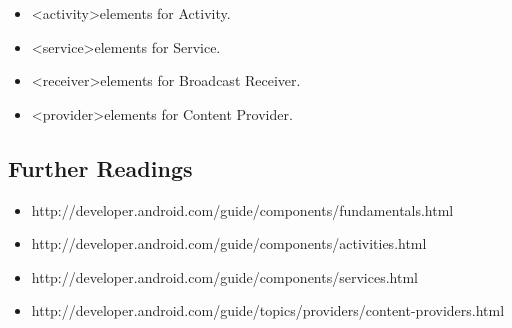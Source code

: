 \documentclass[10pt, letterpaper]{article}
\begin{document}
\begin{itemize}
\item \textless activity\textgreater elements for Activity.
\item \textless service\textgreater elements for Service.
\item \textless receiver\textgreater elements for Broadcast Receiver.
\item \textless provider\textgreater elements for Content Provider.
\end{itemize}

\subsection{Further Readings}
\begin{itemize}
\item[\Checkmark] http://developer.android.com/guide/components/fundamentals.html
\item[\Checkmark] http://developer.android.com/guide/components/activities.html
\item[\Checkmark] http://developer.android.com/guide/components/services.html
\item[\Checkmark] http://developer.android.com/guide/topics/providers/content-providers.html
\end{itemize}
\end{document}
